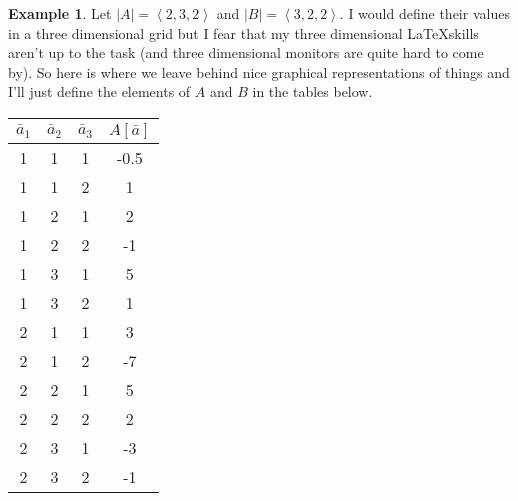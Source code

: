 \documentclass[12pt]{book}
\theoremstyle{plain}
\theoremstyle{definition}
\newtheorem{example}{Example}[chapter]
\theoremstyle{ppart}
\theoremstyle{case}
\theoremstyle{solution}
\newcommand{\shape}[1]{\left|#1\right|}
\begin{document}
\newpage
\begin{example}
Let $\shape{A} = \left<2, 3, 2\right>$ and $\shape{B} = \left<3, 2, 2\right>$. I would
define their values in a three dimensional grid but I fear that my three dimensional
\LaTeX skills aren't up to the task (and three dimensional monitors are quite hard to
come by). So here is where we leave behind nice graphical representations of
things and I'll just define the elements of $A$ and $B$ in the tables below.
\begin{table}[h!]
\begin{center}
\begin{tabular}{c c c | c}
$\bar{a}_1$ & $\bar{a}_2$ & $\bar{a}_3$ & $A[\bar{a}]$ \\
\hline
1           & 1           & 1           & -0.5         \\
1           & 1           & 2           & 1            \\
1           & 2           & 1           & 2            \\
1           & 2           & 2           & -1           \\
1           & 3           & 1           & 5            \\
1           & 3           & 2           & 1            \\
2           & 1           & 1           & 3            \\
2           & 1           & 2           & -7           \\
2           & 2           & 1           & 5            \\
2           & 2           & 2           & 2            \\
2           & 3           & 1           & -3           \\
2           & 3           & 2           & -1
\end{tabular}
\end{center}
\end{table}


\end{example}
\end{document}
